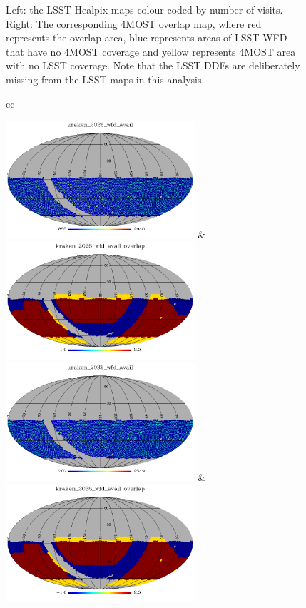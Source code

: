 \documentclass[a4paper,10pt]{article}
\begin{document}
\begin{figure}[htc]
\begin{tabular}{cc}
  \end{tabular}
  \caption{Left: the LSST Healpix maps colour-coded by number of
    visits. Right: The corresponding 4MOST overlap map,
    where red represents the overlap area, blue represents areas of
    LSST WFD that have no 4MOST coverage and yellow represents 4MOST
    area with no LSST coverage. Note that the LSST DDFs are
    deliberately missing from the LSST maps in this analysis. }
  \label{overlap_maps}
\end{figure}

\begin{figure}[htc]
  \begin{tabular}{cc}

    \includegraphics[width=7.0cm]{kraken_2026_wfd_avail_ldep.png} & \includegraphics[width=7.0cm]{kraken_2026_wfd_avail_overlap.png} \cr
    \includegraphics[width=7.0cm]{kraken_2036_wfd_avail_ldep.png} & \includegraphics[width=7.0cm]{kraken_2036_wfd_avail_overlap.png} \cr

\end{tabular}
\end{figure}
\end{document}

